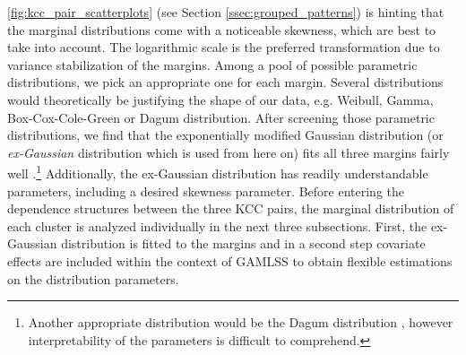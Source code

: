 
\autoref{fig:kcc_pair_scatterplots} (see Section \ref{ssec:grouped_patterns}) is hinting that the marginal distributions come with a noticeable skewness, which are best to take into account. The logarithmic scale is the preferred transformation due to variance stabilization of the margins. Among a pool of possible parametric distributions, we pick an appropriate one for each margin. Several distributions would theoretically be justifying the shape of our data, e.g. Weibull, Gamma, Box-Cox-Cole-Green or Dagum distribution. After screening those parametric distributions, we find that the exponentially modified Gaussian distribution (or \textit{ex-Gaussian} distribution which is used from here on) fits all three margins fairly well \citep{grushka1972characterization}.\footnote{Another appropriate distribution would be the Dagum distribution \citep{dagum1975model}, however interpretability of the parameters is difficult to comprehend.} Additionally, the ex-Gaussian distribution has readily understandable parameters, including a desired skewness parameter.
Before entering the dependence structures between the three \ac{KCC} pairs, the marginal distribution of each cluster is analyzed individually in the next three subsections. First, the ex-Gaussian distribution is fitted to the margins and in a second step covariate effects are included within the context of \ac{GAMLSS} to obtain flexible estimations on the distribution parameters. 








